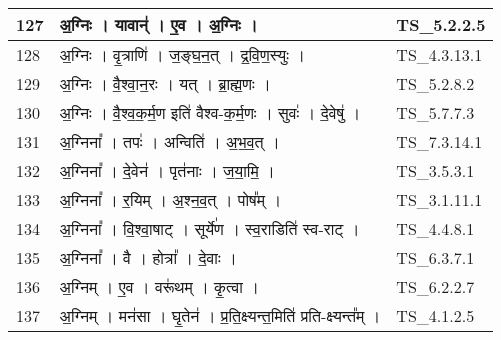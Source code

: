\documentclass[17pt]{extarticle}
\begin{document}
\begin{longtable}{||p{0.4in}||p{4.9in}||p{0.9in}||}
    \hline
        
    127 & अ॒ग्निः   ।   यावान्॑   ।   ए॒व   ।   अ॒ग्निः   ।    & TS\_5.2.2.5       \\
    
    \hline
        
    128 & अ॒ग्निः   ।   वृ॒त्राणि॑   ।   ज॒ङ्घ॒न॒त्   ।   द्र॒वि॒ण॒स्युः   ।    & TS\_4.3.13.1       \\
    
    \hline
        
    129 & अ॒ग्निः   ।   वै॒श्वा॒न॒रः   ।   यत्   ।   ब्रा॒ह्म॒णः   ।    & TS\_5.2.8.2       \\
    
    \hline
        
    130 & अ॒ग्निः   ।   वै॒श्व॒क॒र्म॒ण इति॑ वैश्व{-}क॒र्म॒णः   ।   सुवः॑   ।   दे॒वेषु॑   ।    & TS\_5.7.7.3       \\
    
    \hline
        
    131 & अ॒ग्निना᳚   ।   तपः॑   ।   अन्विति॑   ।   अ॒भ॒व॒त्   ।    & TS\_7.3.14.1       \\
    
    \hline
        
    132 & अ॒ग्निना᳚   ।   दे॒वेन॑   ।   पृत॑नाः   ।   ज॒या॒मि॒   ।    & TS\_3.5.3.1       \\
    
    \hline
        
    133 & अ॒ग्निना᳚   ।   र॒यिम्   ।   अ॒श्न॒व॒त्   ।   पोष᳚म्   ।    & TS\_3.1.11.1       \\
    
    \hline
        
    134 & अ॒ग्निना᳚   ।   वि॒श्वा॒षाट्   ।   सूर्ये॑ण   ।   स्व॒राडिति॑ स्व{-}राट्   ।    & TS\_4.4.8.1       \\
    
    \hline
        
    135 & अ॒ग्निना᳚   ।   वै   ।   होत्रा᳚   ।   दे॒वाः   ।    & TS\_6.3.7.1       \\
    
    \hline
        
    136 & अ॒ग्निम्   ।   ए॒व   ।   वरू॑थम्   ।   कृ॒त्वा   ।    & TS\_6.2.2.7       \\
    
    \hline
        
    137 & अ॒ग्निम्   ।   मन॑सा   ।   घृ॒तेन॑   ।   प्र॒ति॒क्ष्यन्त॒मिति॑ प्रति{-}क्ष्यन्त᳚म्   ।    & TS\_4.1.2.5       \\
    

\end{longtable}
\end{document}
